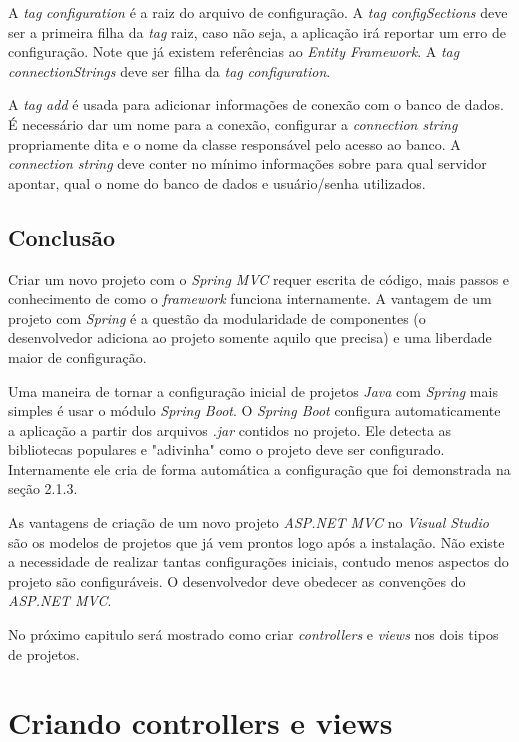 \documentclass[a4paper,12pt]{article}
\newcommand{\est}[1] {
\textit{#1}}
\newcommand{\lang}[1] {
\textit{#1}}
\begin{document}
A \est{tag} \est{configuration} é a raiz do arquivo de configuração. A \est{tag} \est{configSections} deve ser a primeira filha da \est{tag} raiz, caso não seja, a aplicação irá reportar um erro de configuração. Note que já existem referências ao \est{Entity Framework}. A \est{tag} \est{connectionStrings} deve ser filha da \est{tag} \est{configuration}.

A \est{tag} \est{add} é usada para adicionar informações de conexão com o banco de dados. É necessário dar um nome para a conexão, configurar a \est{connection string} propriamente dita e o nome da classe responsável pelo acesso ao banco. A \est{connection string} deve conter no mínimo informações sobre para qual servidor apontar, qual o nome do banco de dados e usuário/senha utilizados. 

\subsection{Conclusão}

Criar um novo projeto com o \est{Spring MVC} requer escrita de código, mais passos e conhecimento de como o \est{framework} funciona internamente. A vantagem de um projeto com \est{Spring} é a questão da modularidade de componentes (o desenvolvedor adiciona ao projeto somente aquilo que precisa) e uma liberdade maior de configuração.

Uma maneira de tornar a configuração inicial de projetos \lang{Java} com \est{Spring} mais simples é usar o módulo \est{Spring Boot}. O \est{Spring Boot} configura automaticamente a aplicação a partir dos arquivos \est{.jar} contidos no projeto. Ele detecta as bibliotecas populares e "adivinha" como o projeto deve ser configurado. Internamente ele cria de forma automática a configuração que foi demonstrada na seção 2.1.3.

As vantagens de criação de um novo projeto \est{ASP.NET MVC} no \est{Visual Studio} são os modelos de projetos que já vem prontos logo após a instalação. Não existe a necessidade de realizar tantas configurações iniciais, contudo menos aspectos do projeto são configuráveis. O desenvolvedor deve obedecer as convenções do \est{ASP.NET MVC}.

No próximo capitulo será mostrado como criar \est{controllers} e \est{views} nos dois tipos de projetos.

\newpage
\section{Criando controllers e views}
\end{document}

